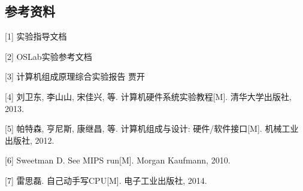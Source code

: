 \subsection{参考资料}
[1] 实验指导文档

[2] OSLab实验参考文档
	
[3] 计算机组成原理综合实验报告 贾开

[4] 刘卫东, 李山山, 宋佳兴, 等. 计算机硬件系统实验教程[M]. 清华大学出版社, 2013.
	
[5] 帕特森, 亨尼斯, 康继昌, 等. 计算机组成与设计: 硬件/软件接口[M]. 机械工业出版社, 2012.
	
[6] Sweetman D. See MIPS run[M]. Morgan Kaufmann, 2010.

[7] 雷思磊. 自己动手写CPU[M]. 电子工业出版社, 2014.
